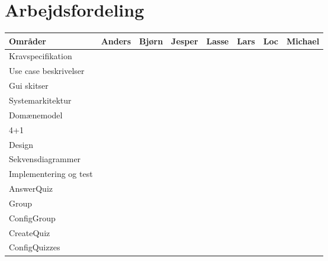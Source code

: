\chapter*{Arbejdsfordeling}




\begin{tabular}{|l|c|c|c|c|c|c|c|}
\hline 
\rowcolor{Gray}
\textbf{Områder} 			& Anders 		& Bjørn 	& Jesper 		& Lasse 	& Lars 		& Loc 		& Michael \\ 
\hline

Kravspecifikation 		&\checkmark &\checkmark	&\checkmark	&\checkmark	&\checkmark	&\checkmark	&\checkmark \\ 
\hline

Use case beskrivelser 		&\checkmark &\checkmark	&\checkmark	&\checkmark	&\checkmark	&\checkmark	&\checkmark \\ 
\hline

Gui skitser 		&\checkmark &	&\checkmark	&\checkmark	&\checkmark	&	&	\\ 
\hline

\rowcolor{Gray}
Systemarkitektur 		&\multicolumn{7}{c|}{ } \\ 
\hline
Domænemodel		&	&	&	&	& 	&\checkmark	&	 \\ 
\hline

4+1		&	&\checkmark	&\checkmark	&\checkmark	&\checkmark 	&	&	 \\ 
\hline

\rowcolor{Gray}
Design 		&\multicolumn{7}{c|}{ } \\ 
\hline
Sekvensdiagrammer		&	&	&	&	& 	&	&\checkmark	 \\ 
\hline

\rowcolor{Gray}
Implementering og test 		&\multicolumn{7}{c|}{ } \\ 
\hline

AnswerQuiz		&\checkmark	&	&	&\checkmark	& 	&	&	 \\ 
\hline

Group		&	&	&\checkmark	&	& 	&	& \\ 
\hline

ConfigGroup		&	&	&	&	& 	&	&\checkmark	 \\ 
\hline

CreateQuiz	&	&	&	&\checkmark	&\checkmark 	&	& \\ 
\hline

ConfigQuizzes 		&	&\checkmark	&	&\checkmark	& 	&	& \\ 
\hline 


\end{tabular}
